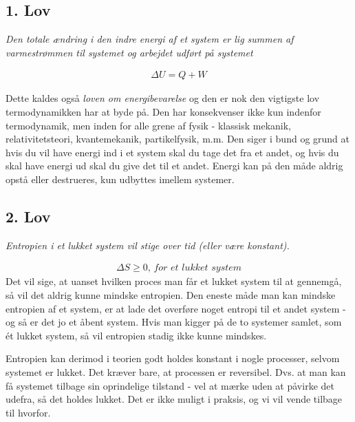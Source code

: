 \documentclass[crop=false, class=memoir]{standalone}
\begin{document}
\subsection{1. Lov}

\begin{center}
    \textit{Den totale ændring i den indre energi af et system er lig summen af varmestrømmen til systemet og arbejdet udført på systemet}
\end{center}
\begin{align}
    \boxed{\Delta U = Q + W}
    \label{termo:eq:lov1}
\end{align}

Dette kaldes også \textit{loven om energibevarelse} og den er nok den vigtigste lov termodynamikken har at byde på. Den har konsekvenser ikke kun indenfor termodynamik, men inden for alle grene af fysik - klassisk mekanik, relativitetsteori, kvantemekanik, partikelfysik, m.m.
Den siger i bund og grund at hvis du vil have energi ind i et system skal du tage det fra et andet, og hvis du skal have energi ud skal du give det til et andet. Energi kan på den måde aldrig opstå eller destrueres, kun udbyttes imellem systemer. 

\subsection{2. Lov}
\begin{center}
    \textit{Entropien i et lukket system vil stige over tid (eller være konstant).}
\end{center}
\begin{align}
    \boxed{\Delta S \geq 0 \textit{, for et lukket system}}
    \label{termo:eq:lov2}
\end{align}
Det vil sige, at uanset hvilken proces man får et lukket system til at gennemgå, så vil det aldrig kunne mindske entropien. Den eneste måde man kan mindske entropien af et system, er at lade det overføre noget entropi til et andet system - og så er det jo et åbent system. Hvis man kigger på de to systemer samlet, som ét lukket system, så vil entropien stadig ikke kunne mindskes.

Entropien kan derimod i teorien godt holdes konstant i nogle processer, selvom systemet er lukket. Det kræver bare, at processen er reversibel. Dvs. at man kan få systemet tilbage sin oprindelige tilstand - vel at mærke uden at påvirke det udefra, så det holdes lukket. Det er ikke muligt i praksis, og vi vil vende tilbage til hvorfor.
\end{document}
